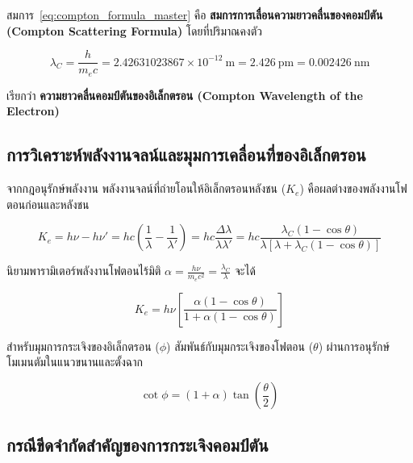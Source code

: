 สมการ~\eqref{eq:compton_formula_master} คือ \textbf{สมการการเลื่อนความยาวคลื่นของคอมป์ตัน (Compton Scattering Formula)} โดยที่ปริมาณคงตัว

\begin{equation}
\lambda_C = \frac{h}{m_e c} = 2.42631023867 \times 10^{-12}~\text{m} = 2.426~\text{pm} = 0.002426~\text{nm}
\label{eq:compton_wavelength_value}
\end{equation}

เรียกว่า \textbf{ความยาวคลื่นคอมป์ตันของอิเล็กตรอน (Compton Wavelength of the Electron)}

\subsection{การวิเคราะห์พลังงานจลน์และมุมการเคลื่อนที่ของอิเล็กตรอน}

จากกฎอนุรักษ์พลังงาน พลังงานจลน์ที่ถ่ายโอนให้อิเล็กตรอนหลังชน ($K_e$) คือผลต่างของพลังงานโฟตอนก่อนและหลังชน

\begin{equation}
K_e = h\nu - h\nu' = hc\left( \frac{1}{\lambda} - \frac{1}{\lambda'} \right) = hc \frac{\Delta\lambda}{\lambda \lambda'} = hc \frac{\lambda_C(1 - \cos\theta)}{\lambda [\lambda + \lambda_C(1 - \cos\theta)]}
\end{equation}

นิยามพารามิเตอร์พลังงานโฟตอนไร้มิติ $\alpha = \frac{h\nu}{m_e c^2} = \frac{\lambda_C}{\lambda}$ จะได้

\begin{equation}
K_e = h\nu \left[ \frac{\alpha(1 - \cos\theta)}{1 + \alpha(1 - \cos\theta)} \right]
\label{eq:electron_kinetic_energy}
\end{equation}

สำหรับมุมการกระเจิงของอิเล็กตรอน ($\phi$) สัมพันธ์กับมุมกระเจิงของโฟตอน ($\theta$) ผ่านการอนุรักษ์โมเมนตัมในแนวขนานและตั้งฉาก

\begin{equation}
\cot\phi = (1 + \alpha)\tan\left( \frac{\theta}{2} \right)
\label{eq:recoil_angle_relation}
\end{equation}

\subsection{กรณีขีดจำกัดสำคัญของการกระเจิงคอมป์ตัน}

